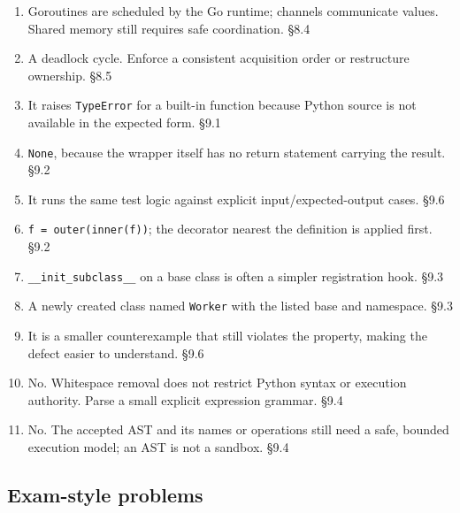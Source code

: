 \documentclass[11pt]{article}
\begin{document}
\begin{keepsection}
\begin{keepsection}
\begin{enumerate}
\item Goroutines are scheduled by the Go runtime; channels communicate values. Shared memory still requires safe coordination. \hfill{\small\color{FAUblue}§8.4}
\item A deadlock cycle. Enforce a consistent acquisition order or restructure ownership. \hfill{\small\color{FAUblue}§8.5}
\item It raises \texttt{TypeError} for a built-in function because Python source is not available in the expected form. \hfill{\small\color{FAUblue}§9.1}
\item \texttt{None}, because the wrapper itself has no return statement carrying the result. \hfill{\small\color{FAUblue}§9.2}
\item It runs the same test logic against explicit input/expected-output cases. \hfill{\small\color{FAUblue}§9.6}
\item \texttt{f = outer(inner(f))}; the decorator nearest the definition is applied first. \hfill{\small\color{FAUblue}§9.2}
\item \texttt{\_\_init\_subclass\_\_} on a base class is often a simpler registration hook. \hfill{\small\color{FAUblue}§9.3}
\item A newly created class named \texttt{Worker} with the listed base and namespace. \hfill{\small\color{FAUblue}§9.3}
\item It is a smaller counterexample that still violates the property, making the defect easier to understand. \hfill{\small\color{FAUblue}§9.6}
\item No. Whitespace removal does not restrict Python syntax or execution authority. Parse a small explicit expression grammar. \hfill{\small\color{FAUblue}§9.4}
\item No. The accepted AST and its names or operations still need a safe, bounded execution model; an AST is not a sandbox. \hfill{\small\color{FAUblue}§9.4}
\end{enumerate}

\end{keepsection}
\begin{keepsection}\subsection{Exam-style problems}


\end{keepsection}
\end{keepsection}
\end{document}
